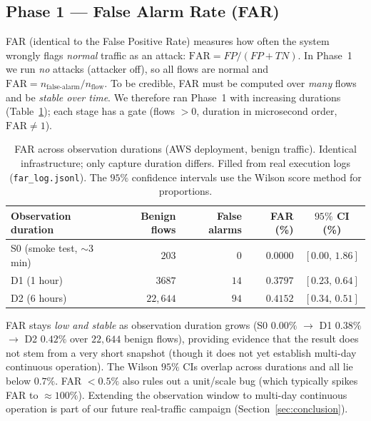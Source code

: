 \documentclass[preprint,12pt,authoryear]{elsarticle}
\begin{document}
\subsection{Phase 1 --- False Alarm Rate (FAR)}
\label{sec:rt-far}
FAR (identical to the False Positive Rate) measures how often the system wrongly
flags \emph{normal} traffic as an attack: $\mathrm{FAR} = FP/(FP+TN)$. In Phase~1
we run \emph{no} attacks (attacker off), so all flows are normal and
$\mathrm{FAR} = n_{\text{false-alarm}}/n_{\text{flow}}$. To be credible, FAR must
be computed over \emph{many} flows and be \emph{stable over time}. We therefore
ran Phase~1 with increasing durations (Table~\ref{tab:far}); each stage has a gate
(flows $>0$, duration in microsecond order, $\mathrm{FAR}\neq 1$).

\begin{table}[h]
\centering
\caption{FAR across observation durations (AWS deployment, benign traffic).
Identical infrastructure; only capture duration differs. Filled from real
execution logs (\texttt{far\_log.jsonl}). The $95\%$ confidence intervals use the
Wilson score method for proportions.}
\label{tab:far}
\begin{tabular}{lrrrc}
\toprule
Observation duration & Benign flows & False alarms & FAR (\%) & $95\%$ CI (\%) \\
\midrule
S0 (smoke test, $\sim$3 min) & $203$    & $0$  & $0.0000$ & $[0.00,\,1.86]$ \\
D1 (1 hour)                  & $3687$   & $14$ & $0.3797$ & $[0.23,\,0.64]$ \\
D2 (6 hours)                 & $22{,}644$ & $94$ & $0.4152$ & $[0.34,\,0.51]$ \\
\bottomrule
\end{tabular}
\end{table}

\noindent FAR stays \emph{low and stable} as observation duration grows (S0
$0.00\%$ $\rightarrow$ D1 $0.38\%$ $\rightarrow$ D2 $0.42\%$ over $22{,}644$ benign
flows), providing evidence that the result does not stem from a very short snapshot
(though it does not yet establish multi-day continuous operation). The Wilson $95\%$
CIs overlap across durations and all lie below $0.7\%$. FAR $<0.5\%$ also
rules out a unit/scale bug (which typically spikes FAR to $\approx 100\%$).
Extending the observation window to multi-day continuous operation is part of our
future real-traffic campaign (Section~\ref{sec:conclusion}).
\end{document}
